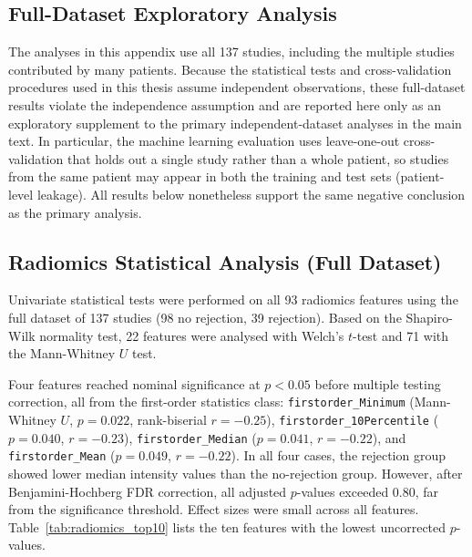 \begin{appendices}

\chapter{Full-Dataset Exploratory Analysis}
\label{app:full_dataset}

The analyses in this appendix use all 137 studies, including the multiple studies contributed by many patients. Because the statistical tests and cross-validation procedures used in this thesis assume independent observations, these full-dataset results violate the independence assumption and are reported here only as an exploratory supplement to the primary independent-dataset analyses in the main text. In particular, the machine learning evaluation uses leave-one-out cross-validation that holds out a single study rather than a whole patient, so studies from the same patient may appear in both the training and test sets (patient-level leakage). All results below nonetheless support the same negative conclusion as the primary analysis.

\section{Radiomics Statistical Analysis (Full Dataset)}

Univariate statistical tests were performed on all 93 radiomics features using the full dataset of 137 studies (98 no rejection, 39 rejection). Based on the Shapiro-Wilk normality test, 22 features were analysed with Welch's $t$-test and 71 with the Mann-Whitney $U$ test.

Four features reached nominal significance at $p < 0.05$ before multiple testing correction, all from the first-order statistics class: \texttt{firstorder\_Minimum} (Mann-Whitney $U$, $p = 0.022$, rank-biserial $r = -0.25$), \texttt{firstorder\_10Percentile} ($p = 0.040$, $r = -0.23$), \texttt{firstorder\_Median} ($p = 0.041$, $r = -0.22$), and \texttt{firstorder\_Mean} ($p = 0.049$, $r = -0.22$). In all four cases, the rejection group showed lower median intensity values than the no-rejection group. However, after Benjamini-Hochberg FDR correction, all adjusted $p$-values exceeded 0.80, far from the significance threshold. Effect sizes were small across all features. Table~\ref{tab:radiomics_top10} lists the ten features with the lowest uncorrected $p$-values.


\end{appendices}
